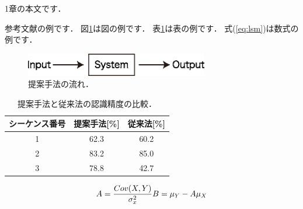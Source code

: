 1章の本文です．

参考文献の例\cite{Koren1991,山下2018,Lavalle1998,坂原2007}です．
図\ref{fig:outline}は図の例です．
表\ref{tab:accuracy}は表の例です．
式(\ref{eq:lsm})は数式の例です．


\begin{figure}[tb]
    \begin{center}
        \includegraphics[width=80mm]{figure/eps/outline.eps}
        \caption{提案手法の流れ．}
        \label{fig:outline}
    \end{center}
\end{figure}



\begin{table}[tb]
  \begin{center}
    \caption{提案手法と従来法の認識精度の比較．}
    \label{tab:accuracy}
    \begin{tabular}{c|c|c} \hline
      シーケンス番号& 提案手法[\%] & 従来法[\%] \\ \hline 
      1 & 62.3 & 60.2  \\
      2 & 83.2 & 85.0 \\
      3 & 78.8 & 42.7 \\ \hline
    \end{tabular}
  \end{center}
\end{table}

\begin{equation}
\label{eq:lsm}
    A = \frac{Cov(X,Y)}{\sigma_x^2} \\
    B = \mu_Y - A\mu_X
\end{equation}

